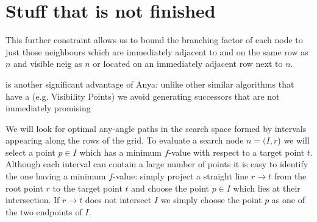 \section{Stuff that is not finished}
This further constraint allows us to bound the branching factor of each
node to just those neighbours which are immediately adjacent to and on
the same row as $n$ and visible neig
as $n$ or located on an immediately adjacent 
row next to $n$.

is another significant advantage of Anya: unlike other similar
algorithms that have a (e.g. Visibility Points) we avoid generating successors that 
are not immediately promising

We will look for optimal any-angle paths in the search space formed by
intervals appearing along the rows of the grid.
To evaluate a search node $n = (I, r$) we will select a point $p \in I$ 
which has a minimum $f$-value with respect to a target point $t$.
Although each interval can contain a large number of points it is easy
to identify the one having a minimum $f$-value: 
simply project a straight line $r \rightarrow t$ from the root point 
$r$ to the target point $t$ and choose the point $p \in I$ which 
lies at their intersection.
If $r \rightarrow t$ does not intersect $I$ we simply choose the point
$p$ as one of the two endpoints of $I$.

